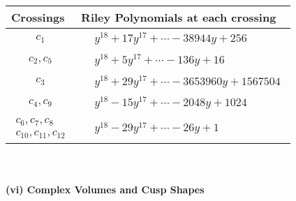 \documentclass[1p]{elsarticle_modified}
\theoremstyle{definition}
\begin{document}
\begin{tabular}{m{50pt}|m{274pt}}
Crossings & \hspace{64pt}Riley Polynomials at each crossing \\
\hline $$\begin{aligned}c_{1}\end{aligned}$$&$\begin{aligned}
&y^{18}+17 y^{17}+\cdots-38944 y+256
\end{aligned}$\\
\hline $$\begin{aligned}c_{2},c_{5}\end{aligned}$$&$\begin{aligned}
&y^{18}+5 y^{17}+\cdots-136 y+16
\end{aligned}$\\
\hline $$\begin{aligned}c_{3}\end{aligned}$$&$\begin{aligned}
&y^{18}+29 y^{17}+\cdots-3653960 y+1567504
\end{aligned}$\\
\hline $$\begin{aligned}c_{4},c_{9}\end{aligned}$$&$\begin{aligned}
&y^{18}-15 y^{17}+\cdots-2048 y+1024
\end{aligned}$\\
\hline $$\begin{aligned}c_{6},c_{7},c_{8}\\c_{10},c_{11},c_{12}\end{aligned}$$&$\begin{aligned}
&y^{18}-29 y^{17}+\cdots-26 y+1
\end{aligned}$\\
\hline
\end{tabular}\\~\\
\newpage\flushleft \textbf{(vi) Complex Volumes and Cusp Shapes}
\end{document}
